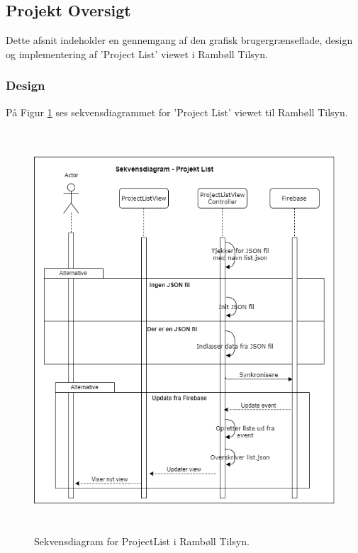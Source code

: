 \subsection{Projekt Oversigt} \label{sec:ProjectList}
Dette afsnit indeholder en gennemgang af den grafisk brugergrænseflade, design og implementering af 'Project List' viewet i Rambøll Tilsyn.

\subsubsection{Design}
På Figur \ref{fig:ProjctListSekvens} ses sekvensdiagrammet for 'Project List' viewet til Rambøll Tilsyn.
\begin{figure}[H] %
	\centering
	\includegraphics[height=15cm, width=15cm]{../ArkitekturDesign/Design/ProjectList/ProjektListSekvensDiagram}
	\caption{Sekvensdiagram for ProjectList i Rambøll Tilsyn.}
	\label{fig:ProjctListSekvens}
\end{figure}

\clearpage

